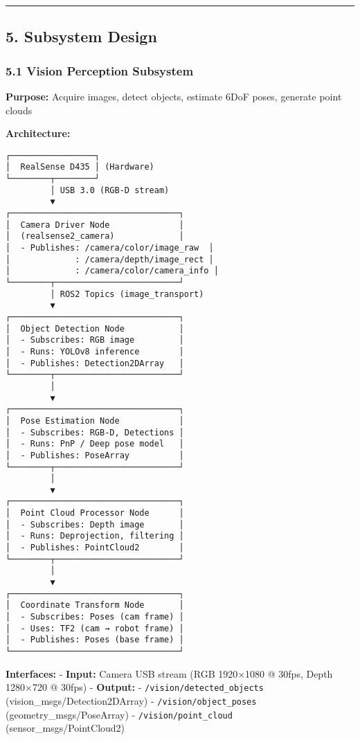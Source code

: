 \documentclass[
]{article}
\begin{document}
\begin{center}\rule{0.5\linewidth}{0.5pt}\end{center}

\hypertarget{subsystem-design}{%
\subsection{5. Subsystem Design}\label{subsystem-design}}

\hypertarget{vision-perception-subsystem}{%
\subsubsection{5.1 Vision Perception
Subsystem}\label{vision-perception-subsystem}}

\textbf{Purpose:} Acquire images, detect objects, estimate 6DoF poses,
generate point clouds

\textbf{Architecture:}

\begin{verbatim}
┌─────────────────┐
│  RealSense D435 │ (Hardware)
└────────┬────────┘
         │ USB 3.0 (RGB-D stream)
         ▼
┌──────────────────────────────────┐
│  Camera Driver Node              │
│  (realsense2_camera)             │
│  - Publishes: /camera/color/image_raw  │
│             : /camera/depth/image_rect │
│             : /camera/color/camera_info │
└────────┬─────────────────────────┘
         │ ROS2 Topics (image_transport)
         ▼
┌──────────────────────────────────┐
│  Object Detection Node           │
│  - Subscribes: RGB image         │
│  - Runs: YOLOv8 inference        │
│  - Publishes: Detection2DArray   │
└────────┬─────────────────────────┘
         │
         ▼
┌──────────────────────────────────┐
│  Pose Estimation Node            │
│  - Subscribes: RGB-D, Detections │
│  - Runs: PnP / Deep pose model   │
│  - Publishes: PoseArray          │
└────────┬─────────────────────────┘
         │
         ▼
┌──────────────────────────────────┐
│  Point Cloud Processor Node      │
│  - Subscribes: Depth image       │
│  - Runs: Deprojection, filtering │
│  - Publishes: PointCloud2        │
└────────┬─────────────────────────┘
         │
         ▼
┌──────────────────────────────────┐
│  Coordinate Transform Node       │
│  - Subscribes: Poses (cam frame) │
│  - Uses: TF2 (cam → robot frame) │
│  - Publishes: Poses (base frame) │
└──────────────────────────────────┘
\end{verbatim}

\textbf{Interfaces:} - \textbf{Input:} Camera USB stream (RGB 1920×1080
@ 30fps, Depth 1280×720 @ 30fps) - \textbf{Output:} -
\texttt{/vision/detected\_objects} (vision\_msgs/Detection2DArray) -
\texttt{/vision/object\_poses} (geometry\_msgs/PoseArray) -
\texttt{/vision/point\_cloud} (sensor\_msgs/PointCloud2)
\end{document}
